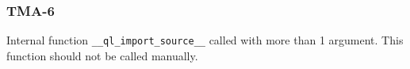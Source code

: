 \subsubsection{TMA-6}\label{sec:error_code_tma_6}

Internal function \texttt{\_\_ql\_import\_source\_\_} called with more than 1 argument. This function should not be called manually.
